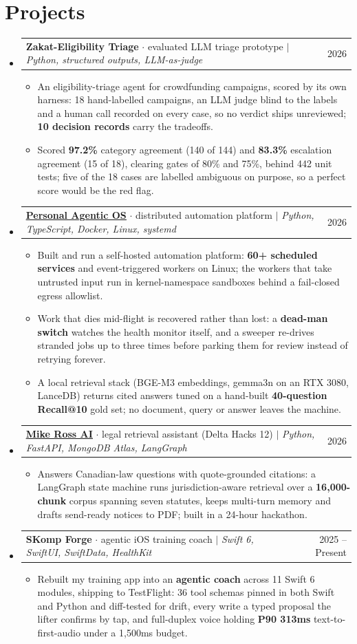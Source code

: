 \documentclass[letterpaper,11pt]{article}
\makeatletter
\newcommand{\resumeItem}[1]{
  \item\small{
    {#1\vspace{-2pt}}
  }
}
\newcommand{\resumeProjectHeading}[2]{
    \item
    \begin{tabular*}{0.97\textwidth}{l@{\extracolsep{\fill}}r}
      \small#1 & #2 \\
    \end{tabular*}\vspace{-7pt}
}
\newcommand{\resumeSubHeadingListStart}{\begin{itemize}[leftmargin=0.15in, label={}]}
\newcommand{\resumeSubHeadingListEnd}{\end{itemize}}
\newcommand{\resumeItemListStart}{\begin{itemize}}
\newcommand{\resumeItemListEnd}{\end{itemize}\vspace{-5pt}}
\makeatother
\begin{document}
\section{Projects}
    \resumeSubHeadingListStart
      \resumeProjectHeading
          {\textbf{Zakat-Eligibility Triage} $\cdot$ evaluated LLM triage prototype $|$ \emph{Python, structured outputs, LLM-as-judge}}{2026}
          \resumeItemListStart
            \resumeItem{An eligibility-triage agent for crowdfunding campaigns, scored by its own harness: 18 hand-labelled campaigns, an LLM judge blind to the labels and a human call recorded on every case, so no verdict ships unreviewed; \textbf{10 decision records} carry the tradeoffs.}
            \resumeItem{Scored \textbf{97.2\%} category agreement (140 of 144) and \textbf{83.3\%} escalation agreement (15 of 18), clearing gates of 80\% and 75\%, behind 442 unit tests; five of the 18 cases are labelled ambiguous on purpose, so a perfect score would be the red flag.}
          \resumeItemListEnd
      \resumeProjectHeading
          {\href{https://www.suleyman.io/architecture}{\underline{\textbf{Personal Agentic OS}}} $\cdot$ distributed automation platform $|$ \emph{Python, TypeScript, Docker, Linux, systemd}}{2026}
          \resumeItemListStart
            \resumeItem{Built and run a self-hosted automation platform: \textbf{60+ scheduled services} and event-triggered workers on Linux; the workers that take untrusted input run in kernel-namespace sandboxes behind a fail-closed egress allowlist.}
            \resumeItem{Work that dies mid-flight is recovered rather than lost: a \textbf{dead-man switch} watches the health monitor itself, and a sweeper re-drives stranded jobs up to three times before parking them for review instead of retrying forever.}
            \resumeItem{A local retrieval stack (BGE-M3 embeddings, gemma3n on an RTX 3080, LanceDB) returns cited answers tuned on a hand-built \textbf{40-question Recall@10} gold set; no document, query or answer leaves the machine.}
          \resumeItemListEnd
      \resumeProjectHeading
          {\href{https://mike-ross.ca/}{\underline{\textbf{Mike Ross AI}}} $\cdot$ legal retrieval assistant (Delta Hacks 12) $|$ \emph{Python, FastAPI, MongoDB Atlas, LangGraph}}{2026}
          \resumeItemListStart
            \resumeItem{Answers Canadian-law questions with quote-grounded citations: a LangGraph state machine runs jurisdiction-aware retrieval over a \textbf{16,000-chunk} corpus spanning seven statutes, keeps multi-turn memory and drafts send-ready notices to PDF; built in a 24-hour hackathon.}
          \resumeItemListEnd
      \resumeProjectHeading
          {\textbf{SKomp Forge} $\cdot$ agentic iOS training coach $|$ \emph{Swift 6, SwiftUI, SwiftData, HealthKit}}{2025 -- Present}
          \resumeItemListStart
            \resumeItem{Rebuilt my training app into an \textbf{agentic coach} across 11 Swift 6 modules, shipping to TestFlight: 36 tool schemas pinned in both Swift and Python and diff-tested for drift, every write a typed proposal the lifter confirms by tap, and full-duplex voice holding \textbf{P90 313ms} text-to-first-audio under a 1,500ms budget.}
          \resumeItemListEnd
    \resumeSubHeadingListEnd
\end{document}

